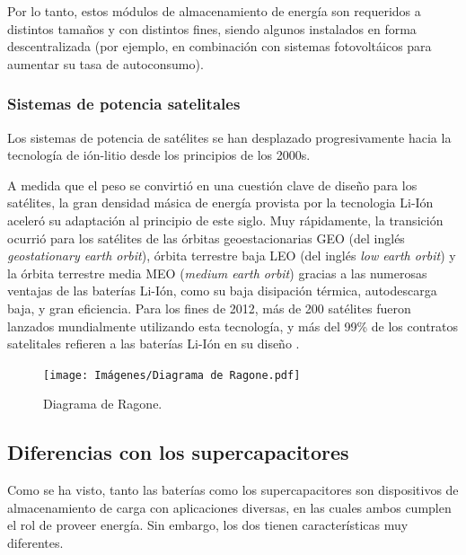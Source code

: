 Por lo tanto, estos módulos de almacenamiento de energía son requeridos a distintos tamaños y con distintos fines, siendo algunos instalados en forma descentralizada (por ejemplo, en combinación con sistemas fotovoltáicos para aumentar su tasa de autoconsumo).

\subsubsection{Sistemas de potencia satelitales}

Los sistemas de potencia de satélites se han desplazado progresivamente hacia la tecnología de ión-litio desde los principios de los 2000s.  

A medida que el peso se convirtió en una cuestión clave de diseño para los satélites, la gran densidad másica de energía provista por la tecnologia Li-Ión aceleró su adaptación al principio de este siglo. Muy rápidamente, la transición ocurrió para los satélites de las órbitas geoestacionarias GEO (del inglés \emph{geostationary earth orbit}), órbita terrestre baja LEO (del inglés \emph{low earth orbit}) y la órbita terrestre media MEO (\emph{medium earth orbit}) gracias a las numerosas ventajas de las baterías Li-Ión, como su baja disipación térmica, autodescarga baja, y gran eficiencia. Para los fines de 2012, más de 200 satélites fueron lanzados mundialmente utilizando esta tecnología, y más del 99\% de los contratos satelitales refieren a las baterías Li-Ión en su diseño \cite{satellites}.

\begin{figure}
  \vspace{-10pt}
  \begin{center}
    \texttt{[image: Imágenes/Diagrama de Ragone.pdf]}
  \end{center}
  \vspace{-15pt}
  \caption{Diagrama de Ragone.}
  \label{ragone}
\end{figure}

\subsection{Diferencias con los supercapacitores}

Como se ha visto, tanto las baterías como los supercapacitores son dispositivos de almacenamiento de carga con aplicaciones diversas, en las cuales ambos cumplen el rol de proveer energía. Sin embargo, los dos tienen características muy diferentes.

